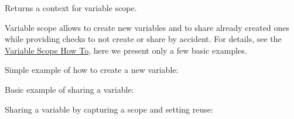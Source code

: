 Returns a context for variable scope.

Variable scope allows to create new variables and to share already
created ones while providing checks to not create or share by accident.
For details, see the
\href{../../how_tos/variable_scope/index.md}{Variable Scope How To},
here we present only a few basic examples.

Simple example of how to create a new variable:

\begin{Shaded}
\begin{Highlighting}[]
 \NormalTok{):}
     \NormalTok{):}
        \OperatorTok{=} \NormalTok{, [}\NormalTok{])}
         \OperatorTok{==} 
\end{Highlighting}
\end{Shaded}

Basic example of sharing a variable:

\begin{Shaded}
\begin{Highlighting}[]
 \NormalTok{):}
    \OperatorTok{=} \NormalTok{, [}\NormalTok{])}
 \OperatorTok{=}\NormalTok{):}
    \OperatorTok{=} \NormalTok{, [}\NormalTok{])}
 \OperatorTok{==} 
\end{Highlighting}
\end{Shaded}

Sharing a variable by capturing a scope and setting reuse:

\begin{Shaded}
\begin{Highlighting}[]
 \NormalTok{) } 
    \OperatorTok{=} \NormalTok{, [}\NormalTok{])}
    \OperatorTok{=} \NormalTok{, [}\NormalTok{])}
 \OperatorTok{==} 
\end{Highlighting}
\end{Shaded}

